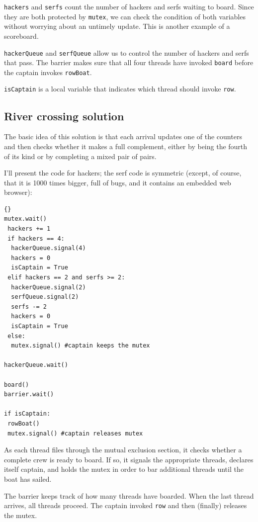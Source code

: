 \documentclass{book}
\begin{document}
{\tt hackers} and {\tt serfs} count the number of hackers
and serfs waiting to board.  Since they are both protected by
    {\tt mutex}, we can check the condition of both variables without
worrying about an untimely update.  This is another example
of a scoreboard.

    {\tt hackerQueue} and {\tt serfQueue} allow us to control the number
of hackers and serfs that pass.  The barrier
makes sure that all four threads have invoked
    {\tt board} before the captain invokes {\tt rowBoat}.

{\tt isCaptain} is a local variable that
indicates which thread should invoke {\tt row}.


\subsection {River crossing solution}

The basic idea of this solution is that each arrival updates
one of the counters and then checks whether it makes a
full complement, either by being the fourth of its kind or
by completing a mixed pair of pairs.

I'll present the code for hackers; the serf code is
symmetric (except, of course, that it is 1000 times bigger,
full of bugs, and it contains an embedded web browser):

\newpage
\begin{lstlisting}[title={River crossing solution}]{}
mutex.wait()
 hackers += 1
 if hackers == 4:
  hackerQueue.signal(4)                
  hackers = 0
  isCaptain = True
 elif hackers == 2 and serfs >= 2:
  hackerQueue.signal(2)                
  serfQueue.signal(2)                  
  serfs -= 2
  hackers = 0
  isCaptain = True
 else:
  mutex.signal() #captain keeps the mutex

hackerQueue.wait()           

board()
barrier.wait()            

if isCaptain:
 rowBoat()
 mutex.signal() #captain releases mutex
\end{lstlisting}

As each thread files through the mutual exclusion section, it
checks whether a complete crew is ready to board.  If so, it
signals the appropriate threads, declares itself captain, and
holds the mutex in order to bar additional threads until the
boat has sailed.

The barrier keeps track of how many threads have boarded.
When the last thread arrives, all threads proceed.
The captain invoked {\tt row} and then (finally) releases the mutex.
\end{document}
